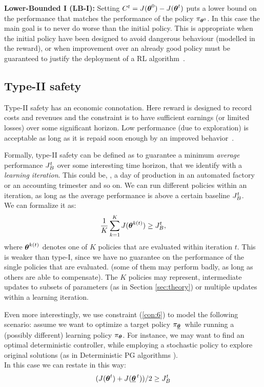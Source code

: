\textbf{Lower-Bounded I (LB-I):}
Setting $C^t = J(\vtheta^0) - J(\vtheta^t)$ puts a lower bound on the performance that matches the performance of the policy $\pi_{\vtheta^0}$. In this case the main goal is to never do worse than the initial policy. This is appropriate when the initial policy have been designed to avoid dangerous behaviour (modelled in the reward), or when improvement over an already good policy must be guaranteed to justify the deployment of a RL algorithm~\cite{pmlr-v37-thomas15}.



\subsection{Type-II safety}

Type-II safety has an economic connotation. Here reward is designed to record costs and revenues and the constraint is to have sufficient earnings (or limited losses) over some significant horizon. Low performance (\eg due to exploration) is acceptable as long as it is repaid soon enough by an improved behavior~\cite{adaptive_batch}\cite{pmlr-v37-thomas15}.

Formally, type-II safety can be defined as to guarantee a minimum \textit{average} performance $\jbase$ over some interesting time horizon, that we identify with a \textit{learning iteration}. This could be, \eg, a day of production in an automated factory or an accounting trimester and so on. We can run different policies within an iteration, as long as the average performance is above a certain baseline $\jbase$.\\
We can formalize it as: 
\begin{align}\label{con:6}
\frac{1}{K}\sum_{k=1}^{K}J(\vtheta^{k(t)}) \geq \jbase,
\end{align}
where $\vtheta^{k(t)}$ denotes one of $K$ policies that are evaluated within iteration $t$. This is weaker than type-I, since we have no guarantee on the performance of the single policies that are evaluated. (some of them may perform badly, as long as others are able to compensate). The $K$ policies may represent, \eg intermediate updates to subsets of parameters (as in Section \ref{sec:theory}) or multiple updates within a learning iteration. 

Even more interestingly, we use constraint (\ref{con:6}) to model the following scenario: assume we want to optimize a target policy $\pi_{\vtarget[]}$ while running a (possibly different) learning policy $\pi_{\vtheta}$. For instance, we may want to find an optimal deterministic controller, while employing a stochastic policy to explore original solutions (as in Deterministic PG algorithms \cite{silver2014deterministic}). \\
In this case we can restate  in this way:
\begin{align}\label{con:6target}
(J(\vtheta^t) + J(\vtarget))/2 \geq \jbase
\end{align}

